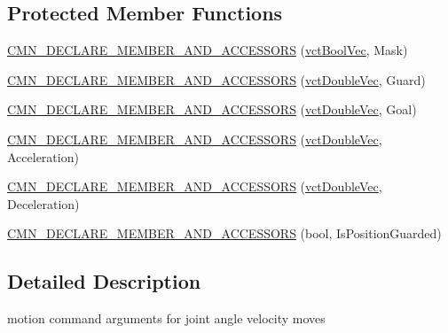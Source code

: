 \subsection*{Protected Member Functions}
\begin{DoxyCompactItemize}
\item 
\hyperlink{classprm_velocity_joint_set_a73e860fe288cb298d1d4f25b80cd5f02}{C\-M\-N\-\_\-\-D\-E\-C\-L\-A\-R\-E\-\_\-\-M\-E\-M\-B\-E\-R\-\_\-\-A\-N\-D\-\_\-\-A\-C\-C\-E\-S\-S\-O\-R\-S} (\hyperlink{vct_dynamic_vector_types_8h_aeb2237c134aee3769198bd9d55c8a9e0}{vct\-Bool\-Vec}, Mask)
\item 
\hyperlink{classprm_velocity_joint_set_a42540912b2e05179208ef22f45ae1a4a}{C\-M\-N\-\_\-\-D\-E\-C\-L\-A\-R\-E\-\_\-\-M\-E\-M\-B\-E\-R\-\_\-\-A\-N\-D\-\_\-\-A\-C\-C\-E\-S\-S\-O\-R\-S} (\hyperlink{vct_dynamic_vector_types_8h_ade4b3068c86fb88f41af2e5187e491c2}{vct\-Double\-Vec}, Guard)
\item 
\hyperlink{classprm_velocity_joint_set_a2c8bb13d09ce37206c4d0172a10f5840}{C\-M\-N\-\_\-\-D\-E\-C\-L\-A\-R\-E\-\_\-\-M\-E\-M\-B\-E\-R\-\_\-\-A\-N\-D\-\_\-\-A\-C\-C\-E\-S\-S\-O\-R\-S} (\hyperlink{vct_dynamic_vector_types_8h_ade4b3068c86fb88f41af2e5187e491c2}{vct\-Double\-Vec}, Goal)
\item 
\hyperlink{classprm_velocity_joint_set_aef2f30ae6d30e8f778632f6a695e2297}{C\-M\-N\-\_\-\-D\-E\-C\-L\-A\-R\-E\-\_\-\-M\-E\-M\-B\-E\-R\-\_\-\-A\-N\-D\-\_\-\-A\-C\-C\-E\-S\-S\-O\-R\-S} (\hyperlink{vct_dynamic_vector_types_8h_ade4b3068c86fb88f41af2e5187e491c2}{vct\-Double\-Vec}, Acceleration)
\item 
\hyperlink{classprm_velocity_joint_set_a021585bd893928f56766efd998656591}{C\-M\-N\-\_\-\-D\-E\-C\-L\-A\-R\-E\-\_\-\-M\-E\-M\-B\-E\-R\-\_\-\-A\-N\-D\-\_\-\-A\-C\-C\-E\-S\-S\-O\-R\-S} (\hyperlink{vct_dynamic_vector_types_8h_ade4b3068c86fb88f41af2e5187e491c2}{vct\-Double\-Vec}, Deceleration)
\item 
\hyperlink{classprm_velocity_joint_set_a49e79113209d73cc0daca3a18b7dd7cd}{C\-M\-N\-\_\-\-D\-E\-C\-L\-A\-R\-E\-\_\-\-M\-E\-M\-B\-E\-R\-\_\-\-A\-N\-D\-\_\-\-A\-C\-C\-E\-S\-S\-O\-R\-S} (bool, Is\-Position\-Guarded)
\end{DoxyCompactItemize}


\subsection{Detailed Description}
motion command arguments for joint angle velocity moves 

